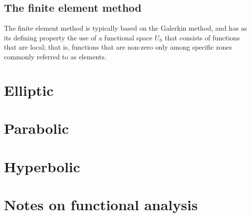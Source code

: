 \documentclass[oneside,a4paper,11pt]{report}
\begin{document}
\section{The finite element method}
The finite element method is typically based on the Galerkin method, and has as its defining property the use of a functional space $U_h$ that consists of functions that are local; that is, functions that are non-zero only among specific zones commonly referred to as elements.

\chapter{Elliptic}

\chapter{Parabolic}

\chapter{Hyperbolic}

\appendix
\chapter{Notes on functional analysis}

\end{document}
